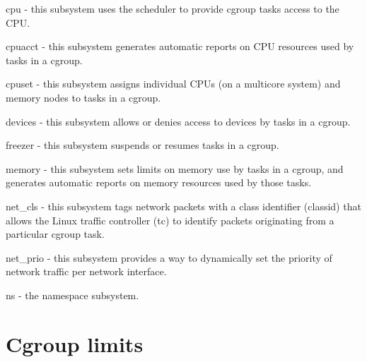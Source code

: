 cpu - this subsystem uses the scheduler to provide cgroup tasks access to the CPU. 

cpuacct - this subsystem generates automatic reports on CPU resources used by tasks in a cgroup. 

cpuset - this subsystem assigns individual CPUs (on a multicore system) and memory nodes to tasks in a cgroup. 

devices - this subsystem allows or denies access to devices by tasks in a cgroup. 

freezer - this subsystem suspends or resumes tasks in a cgroup. 

memory - this subsystem sets limits on memory use by tasks in a cgroup, and generates automatic reports on memory resources used by those tasks. 

net\_cls - this subsystem tags network packets with a class identifier (classid) that allows the Linux traffic controller (tc) to identify
packets originating from a particular cgroup task. 

net\_prio - this subsystem provides a way to dynamically set the priority of network traffic per network interface. 

ns - the namespace subsystem.\\
\cite{cgroups}

\section{Cgroup limits}

